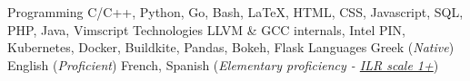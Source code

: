 

\begin{cvskills}

  \cvskill
    {Programming}
        {C/C++, Python, Go, Bash, \LaTeX, HTML, CSS, Javascript, SQL, PHP, Java, Vimscript}
  \cvskill
    {Technologies} %
        {LLVM \& GCC internals, Intel PIN, Kubernetes, Docker, Buildkite, Pandas, Bokeh, Flask} %
  \cvskill
    {Languages} %
    {Greek (\textit{Native}) \hspace*{7pt} English (\textit{Proficient}) \hspace*{7pt}  French, Spanish (\textit{Elementary proficiency - \href{http://www.govtilr.org/skills/ILRscale1.htm}{ILR scale 1+}})}

\end{cvskills}
\pagebreak
